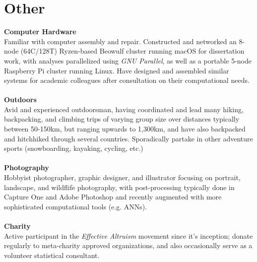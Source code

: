 \documentclass[12pt]{article}
\begin{document}
\section{Other}
\textbf{Computer Hardware}\\ Familiar with computer assembly and repair. Constructed and networked an 8-node (64C/128T) Ryzen-based Beowulf cluster running macOS for dissertation work, with analyses parallelized using \emph{GNU Parallel}, as well as a portable 5-node Raspberry Pi cluster running Linux. Have designed and assembled similar systems for academic colleagues after consultation on their computational needs.\\\\
\textbf{Outdoors}\\ Avid and experienced outdoorsman, having coordinated and lead many hiking, backpacking, and climbing trips of varying group size over distances typically between 50-150km, but ranging upwards to 1,300km, and have also backpacked and hitchhiked through several countries. Sporadically partake in other adventure sports (snowboarding, kayaking, cycling, etc.) \\\\
\textbf{Photography}\\ Hobbyist photographer, graphic designer, and illustrator focusing on portrait, landscape, and wildflife photography, with post-processing typically done in Capture One and Adobe Photoshop and recently augmented with more sophisticated computational tools (e.g. ANNs).\\\\
\textbf{Charity}\\ Active participant in the \emph{Effective Altruism} movement since it's inception; donate regularly to meta-charity approved organizations, and also occasionally serve as a volunteer statistical consultant.\\\\

\end{document}
